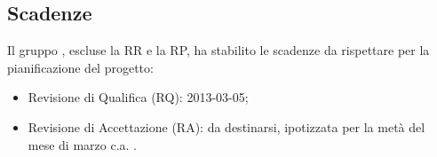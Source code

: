 {{{		}
		}
	\subsection{Scadenze}{
Il gruppo \textit{\ggt}, escluse la RR e la RP, ha stabilito le scadenze da rispettare per la pianificazione del progetto:
	\begin{itemize}
		\item[] Revisione di Qualifica (RQ): 2013-03-05;
		\item[] Revisione di Accettazione (RA): da destinarsi, ipotizzata per la metà del mese di marzo c.a. .
	\end{itemize}
	}
	
}

